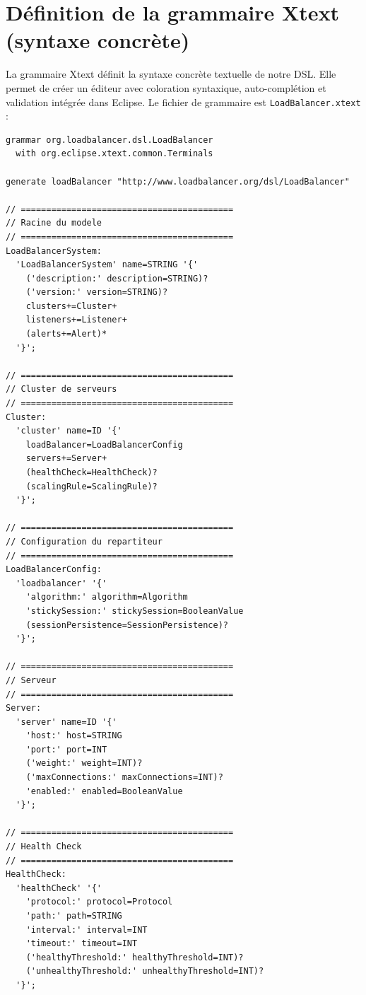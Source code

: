 \documentclass[12pt,a4paper]{report}
\begin{document}
\section{Définition de la grammaire Xtext (syntaxe concrète)}

La grammaire Xtext définit la syntaxe concrète textuelle de notre DSL. Elle permet de créer un éditeur avec coloration syntaxique, auto-complétion et validation intégrée dans Eclipse. Le fichier de grammaire est \texttt{LoadBalancer.xtext} :

\begin{lstlisting}[language=Xtext, caption={Grammaire Xtext complète du DSL de répartition de charge}]
grammar org.loadbalancer.dsl.LoadBalancer
  with org.eclipse.xtext.common.Terminals

generate loadBalancer "http://www.loadbalancer.org/dsl/LoadBalancer"

// ==========================================
// Racine du modele
// ==========================================
LoadBalancerSystem:
  'LoadBalancerSystem' name=STRING '{'
    ('description:' description=STRING)?
    ('version:' version=STRING)?
    clusters+=Cluster+
    listeners+=Listener+
    (alerts+=Alert)*
  '}';

// ==========================================
// Cluster de serveurs
// ==========================================
Cluster:
  'cluster' name=ID '{'
    loadBalancer=LoadBalancerConfig
    servers+=Server+
    (healthCheck=HealthCheck)?
    (scalingRule=ScalingRule)?
  '}';

// ==========================================
// Configuration du repartiteur
// ==========================================
LoadBalancerConfig:
  'loadbalancer' '{'
    'algorithm:' algorithm=Algorithm
    'stickySession:' stickySession=BooleanValue
    (sessionPersistence=SessionPersistence)?
  '}';

// ==========================================
// Serveur
// ==========================================
Server:
  'server' name=ID '{'
    'host:' host=STRING
    'port:' port=INT
    ('weight:' weight=INT)?
    ('maxConnections:' maxConnections=INT)?
    'enabled:' enabled=BooleanValue
  '}';

// ==========================================
// Health Check
// ==========================================
HealthCheck:
  'healthCheck' '{'
    'protocol:' protocol=Protocol
    'path:' path=STRING
    'interval:' interval=INT
    'timeout:' timeout=INT
    ('healthyThreshold:' healthyThreshold=INT)?
    ('unhealthyThreshold:' unhealthyThreshold=INT)?
  '}';


\end{lstlisting}
\end{document}
